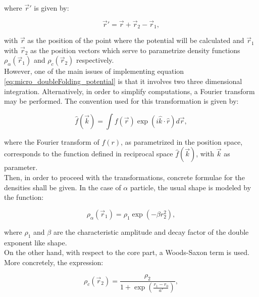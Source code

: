 \documentclass[openany]{book}
\begin{document}
where $\vec r'$ is given by:

\begin{equation}\label{eq:micro_doubleFolding_potential_separationVector}
	\vec r' = \vec r + \vec r_2 - \vec r_1,
\end{equation}

with $\vec r$ as the position of the point where the potential will be calculated and $\vec r_1$ with $\vec r_2$ as the position vectors which serve to parametrize density functions  $\rho_\alpha(\vec r_1)$ and  $\rho_c(\vec r_2)$ respectively. \\

However, one of the main issues of implementing equation \ref{eq:micro_doubleFolding_potential} is that it involves two three dimensional integration. Alternatively, in order to simplify computations, a Fourier transform may be performed. The convention used for this transformation is given by: 

\begin{equation}\label{eq:micro_doubleFolding_fourierTransform}
	\hat f(\vec k) = \int f(\vec r) \exp(i \hat k \cdot \hat r) d \vec r,
\end{equation}

where the Fourier transform of $f(r)$, as parametrized in the position space, corresponds to the function defined in reciprocal space $\hat f(\vec k)$, with $\vec k$ as parameter. \\

Then, in order to proceed with the transformations, concrete formulae for the densities shall be given. In the case of  $\alpha$ particle, the usual shape is modeled by the function:

\begin{equation}\label{eq:micro_doubleFolding_potential_rhoalpha}
	\rho_\alpha (\vec r_1) = \rho_1 \exp (-\beta r^2_2),
\end{equation}

where $\rho_1$ and $\beta$ are the characteristic amplitude and decay factor of the double exponent like shape. \\

On the other hand, with respect to the core part, a Woods-Saxon term is used. More concretely, the expression: 

\begin{equation}\label{eq:micro_doubleFolding_potential_rhoC}
	\rho_c(\vec r_2) =  \frac{\rho_2}{1 + \exp {\left(\frac{r_1 - r_0}{a'}\right)}},
\end{equation}
\end{document}
